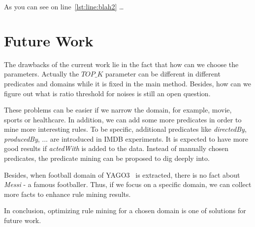 \documentclass{acm_proc_article-sp}
\begin{document}
As you can see on line~\ref{lst:line:blah2} \ldots

\section{Future Work}

The drawbacks of the current work lie in the fact that how can we choose the parameters. Actually the $TOP\_K$ parameter can be different in different predicates and domains while it is fixed in the main method. Besides, how can we figure out what is ratio threshold for noises is still an open question.

These problems can be easier if we narrow the domain, for example, movie, sports or healthcare. In addition, we can add some more predicates in order to mine more interesting rules. To be specific, additional predicates like \textit{directedBy}, \textit{producedBy}, ... are introduced in IMDB experiments. It is expected to have more good results if \textit{actedWith} is added to the data. Instead of manually chosen predicates, the predicate mining can be proposed to dig deeply into.

Besides, when football domain of YAGO3~\cite{ref1} is extracted, there is no fact about \textit{Messi} - a famous footballer. Thus, if we focus on a specific domain, we can collect more facts to enhance rule mining results.

In conclusion, optimizing rule mining for a chosen domain is one of solutions for future work.



\end{document}
